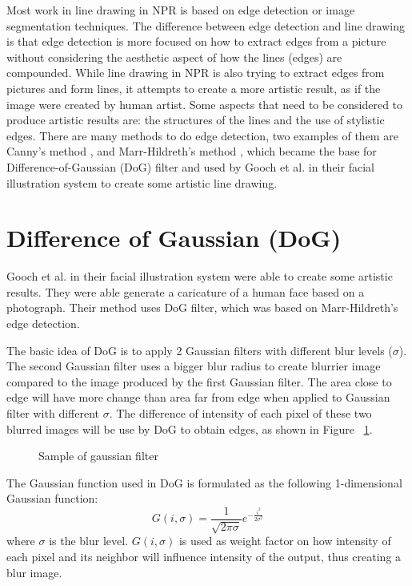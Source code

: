 Most work in line drawing in NPR is based on edge detection or image segmentation techniques. The difference between edge detection and line drawing is that edge detection is more focused on how to extract edges from a picture without considering the aesthetic aspect of how the lines (edges) are compounded. While line drawing in NPR is also trying to extract edges from pictures and form lines, it attempts to create a more artistic result, as if the image were created by human artist. Some aspects that need to be considered to produce artistic results are: the structures of the lines and the use of stylistic edges. There are many methods to do edge detection, two examples of them are Canny's method \cite{canny86}, and Marr-Hildreth's method \cite{marr-hildreth80}, which became the base for Difference-of-Gaussian (DoG) filter and used by Gooch et al. in their facial illustration system to create some artistic line drawing.

\section{Difference of Gaussian (DoG)} 
Gooch et al. in their facial illustration system \cite{gooch04} were able to create some artistic results. They were able generate a caricature of a human face based on a photograph. Their method uses DoG filter, which was based on Marr-Hildreth's edge detection.

The basic idea of DoG is to apply 2 Gaussian filters with different blur levels ($\sigma$). The second Gaussian filter uses a bigger blur radius to create blurrier image compared to the image produced by the first Gaussian filter. The area close to edge will have more change than area far from edge when applied to Gaussian filter with different $\sigma$. The difference of intensity of each pixel of these two blurred images will be use by DoG to obtain edges, as shown in Figure ~\ref{fig:DoG_sample1}.

\begin{figure}[H]
\centering
\caption{Sample of gaussian filter}
\label{fig:DoG_sample1}
\end{figure}

The Gaussian function used in DoG is formulated as the following 1-dimensional Gaussian function:
\begin{equation}
	G(i, \sigma) = \frac{1}{\sqrt{2\pi\sigma}}e^{-\frac{i^2}{2\sigma^2}}
\end{equation}
where $\sigma$ is the blur level. $G(i, \sigma)$ is used as weight factor on how intensity of each pixel and its neighbor will influence intensity of the output, thus creating a blur image. 

